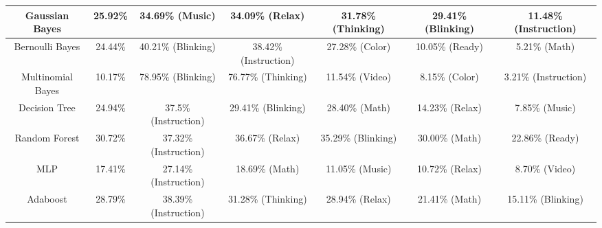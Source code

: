 \begin{table}[]
{\begin{tabular}{|c|c|c|c|c|c|c|}
Gaussian Bayes         & 25.92\%                                                    & 34.69\% (Music)                                          & 34.09\% (Relax)                                          & 31.78\% (Thinking)                                       & 29.41\% (Blinking)                                       & 11.48\% (Instruction)                                    \\ \hline
Bernoulli Bayes        & 24.44\%                                                    & 40.21\% (Blinking)                                       & 38.42\% (Instruction)                                    & 27.28\% (Color)                                          & 10.05\% (Ready)                                          & 5.21\% (Math)                                            \\ \hline
Multinomial Bayes      & 10.17\%                                                    & 78.95\% (Blinking)                                       & 76.77\% (Thinking)                                       & 11.54\% (Video)                                          & 8.15\% (Color)                                           & 3.21\% (Instruction)                                     \\ \hline
Decision Tree          & 24.94\%                                                    & 37.5\% (Instruction)                                     & 29.41\% (Blinking)                                       & 28.40\% (Math)                                           & 14.23\% (Relax)                                          & 7.85\% (Music)                                           \\ \hline
Random Forest          & 30.72\%                                                    & 37.32\% (Instruction)                                    & 36.67\% (Relax)                                          & 35.29\% (Blinking)                                       & 30.00\% (Math)                                           & 22.86\% (Ready)                                          \\ \hline
MLP                    & 17.41\%                                                    & 27.14\% (Instruction)                                    & 18.69\% (Math)                                           & 11.05\% (Music)                                          & 10.72\% (Relax)                                          & 8.70\% (Video)                                           \\ \hline
Adaboost               & 28.79\%                                                    & 38.39\% (Instruction)                                    & 31.28\% (Thinking)                                       & 28.94\% (Relax)                                          & 21.41\% (Math)                                           & 15.11\% (Blinking)                                       \\ \hline

\end{tabular}}
\end{table}
